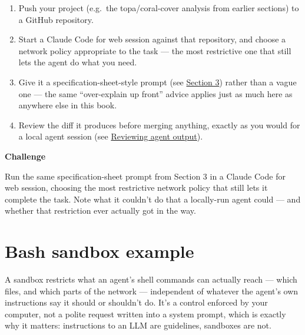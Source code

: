 \documentclass[
  letterpaper,
  DIV=11,
  numbers=noendperiod]{scrreprt}
\providecommand{\tightlist}{%
  \setlength{\itemsep}{0pt}\setlength{\parskip}{0pt}}
\begin{document}
\begin{enumerate}
\def\labelenumi{\arabic{enumi}.}
\tightlist
\item
  Push your project (e.g.~the topa/coral-cover analysis from earlier
  sections) to a GitHub repository.
\item
  Start a Claude Code for web session against that repository, and
  choose a network policy appropriate to the task --- the most
  restrictive one that still lets the agent do what you need.
\item
  Give it a specification-sheet-style prompt (see
  \hyperref[specification-sheets]{Section 3}) rather than a vague one
  --- the same ``over-explain up front'' advice applies just as much
  here as anywhere else in this book.
\item
  Review the diff it produces before merging anything, exactly as you
  would for a local agent session (see
  \hyperref[reviewing-agent-output]{Reviewing agent output}).
\end{enumerate}

\begin{tcolorbox}[enhanced jigsaw, toprule=.15mm, rightrule=.15mm, left=2mm, leftrule=.75mm, breakable, opacityback=0, arc=.35mm, colframe=quarto-callout-important-color-frame, bottomrule=.15mm, colback=white]
\begin{minipage}[t]{5.5mm}
\textcolor{quarto-callout-important-color}{\faExclamation}
\end{minipage}%
\begin{minipage}[t]{\textwidth - 5.5mm}

\vspace{-3mm}\textbf{Challenge}\vspace{3mm}

Run the same specification-sheet prompt from Section 3 in a Claude Code
for web session, choosing the most restrictive network policy that still
lets it complete the task. Note what it couldn't do that a locally-run
agent could --- and whether that restriction ever actually got in the
way.

\end{minipage}%
\end{tcolorbox}

\chapter{Bash sandbox example}\label{bash-sandbox-example}

A sandbox restricts what an agent's shell commands can actually reach
--- which files, and which parts of the network --- independent of
whatever the agent's own instructions say it should or shouldn't do.
It's a control enforced by your computer, not a polite request written
into a system prompt, which is exactly why it matters: instructions to
an LLM are guidelines, sandboxes are not.
\end{document}
